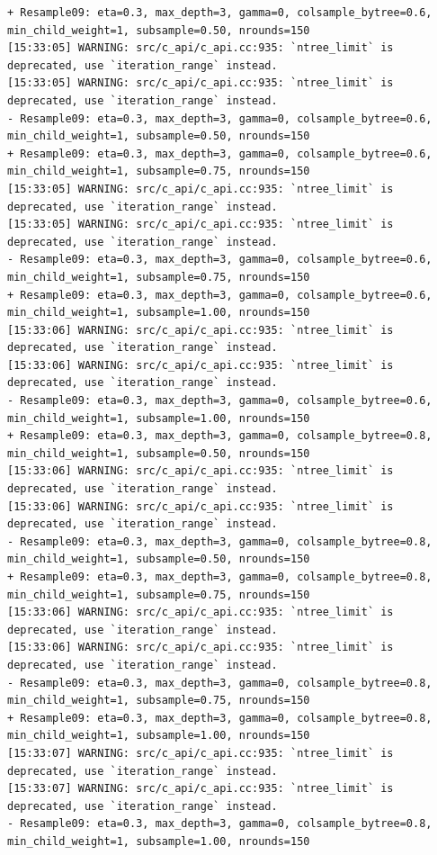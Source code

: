 \documentclass[
  letterpaper,
  DIV=11,
  numbers=noendperiod]{scrartcl}
\begin{document}
\begin{verbatim}
+ Resample09: eta=0.3, max_depth=3, gamma=0, colsample_bytree=0.6, min_child_weight=1, subsample=0.50, nrounds=150 
[15:33:05] WARNING: src/c_api/c_api.cc:935: `ntree_limit` is deprecated, use `iteration_range` instead.
[15:33:05] WARNING: src/c_api/c_api.cc:935: `ntree_limit` is deprecated, use `iteration_range` instead.
- Resample09: eta=0.3, max_depth=3, gamma=0, colsample_bytree=0.6, min_child_weight=1, subsample=0.50, nrounds=150 
+ Resample09: eta=0.3, max_depth=3, gamma=0, colsample_bytree=0.6, min_child_weight=1, subsample=0.75, nrounds=150 
[15:33:05] WARNING: src/c_api/c_api.cc:935: `ntree_limit` is deprecated, use `iteration_range` instead.
[15:33:05] WARNING: src/c_api/c_api.cc:935: `ntree_limit` is deprecated, use `iteration_range` instead.
- Resample09: eta=0.3, max_depth=3, gamma=0, colsample_bytree=0.6, min_child_weight=1, subsample=0.75, nrounds=150 
+ Resample09: eta=0.3, max_depth=3, gamma=0, colsample_bytree=0.6, min_child_weight=1, subsample=1.00, nrounds=150 
[15:33:06] WARNING: src/c_api/c_api.cc:935: `ntree_limit` is deprecated, use `iteration_range` instead.
[15:33:06] WARNING: src/c_api/c_api.cc:935: `ntree_limit` is deprecated, use `iteration_range` instead.
- Resample09: eta=0.3, max_depth=3, gamma=0, colsample_bytree=0.6, min_child_weight=1, subsample=1.00, nrounds=150 
+ Resample09: eta=0.3, max_depth=3, gamma=0, colsample_bytree=0.8, min_child_weight=1, subsample=0.50, nrounds=150 
[15:33:06] WARNING: src/c_api/c_api.cc:935: `ntree_limit` is deprecated, use `iteration_range` instead.
[15:33:06] WARNING: src/c_api/c_api.cc:935: `ntree_limit` is deprecated, use `iteration_range` instead.
- Resample09: eta=0.3, max_depth=3, gamma=0, colsample_bytree=0.8, min_child_weight=1, subsample=0.50, nrounds=150 
+ Resample09: eta=0.3, max_depth=3, gamma=0, colsample_bytree=0.8, min_child_weight=1, subsample=0.75, nrounds=150 
[15:33:06] WARNING: src/c_api/c_api.cc:935: `ntree_limit` is deprecated, use `iteration_range` instead.
[15:33:06] WARNING: src/c_api/c_api.cc:935: `ntree_limit` is deprecated, use `iteration_range` instead.
- Resample09: eta=0.3, max_depth=3, gamma=0, colsample_bytree=0.8, min_child_weight=1, subsample=0.75, nrounds=150 
+ Resample09: eta=0.3, max_depth=3, gamma=0, colsample_bytree=0.8, min_child_weight=1, subsample=1.00, nrounds=150 
[15:33:07] WARNING: src/c_api/c_api.cc:935: `ntree_limit` is deprecated, use `iteration_range` instead.
[15:33:07] WARNING: src/c_api/c_api.cc:935: `ntree_limit` is deprecated, use `iteration_range` instead.
- Resample09: eta=0.3, max_depth=3, gamma=0, colsample_bytree=0.8, min_child_weight=1, subsample=1.00, nrounds=150 

\end{verbatim}
\end{document}
